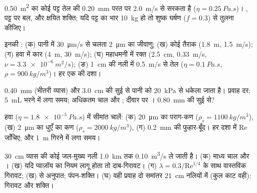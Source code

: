 \begin{exercise}[$\star$]\label{exo:b2:viscous-flows:1}
\qty{0.50}{m^2} का कोई पट्ट तेल की \qty{0.20}{mm} परत पर \qty{2.0}{m/s} से सरकता है
($\eta = \qty{0.25}{Pa.s}$)। , पट्ट पर बल, और क्षयित
शक्ति; यदि पट्ट का भार \qty{10}{kg} हो तो शुष्क घर्षण ($f = 0.3$) से
तुलना कीजिए।
\end{exercise}

\begin{exercise}[$\star$]\label{exo:b2:viscous-flows:2}
इनकी : (क) पानी में \qty{30}{\micro m/s} से चलता
\qty{2}{\micro m} का जीवाणु; (ख) कोई तैराक (\qty{1.8}{m}, \qty{1.5}{m/s}); (ग) हवा में कार (\qty{4}{m},
\qty{30}{m/s}); (घ) महाधमनी में रक्त (\qty{2.5}{cm}, \qty{0.33}{m/s},
$\nu = \qty{3.3e-6}{m^2/s}$); (ङ) \qty{1}{cm} की नली में \qty{0.5}{m/s} से तेल ($\eta = \qty{0.1}{Pa.s}$, $\rho =
\qty{900}{kg/m^3}$)। हर एक की दशा।
\end{exercise}

\begin{exercise}[$\star$]\label{exo:b2:viscous-flows:3}
\qty{0.40}{mm} (भीतरी व्यास) और \qty{3.0}{cm} की सुई से पानी को
\qty{20}{kPa} से धकेला जाता है। प्रवाह दर; \qty{5}{mL} भरने में लगा समय; अधिकतम चाल
और ; दीवार पर । \qty{0.80}{mm} की सुई से?
\end{exercise}

\begin{exercise}[$\star$]\label{exo:b2:viscous-flows:4}
हवा ($\eta = \qty{1.8e-5}{Pa.s}$) में सीमांत चालें: (क) \qty{20}{\micro m}
का पराग-कण ($\rho_s = \qty{1100}{kg/m^3}$), (ख) \qty{2}{\micro m} का धुएँ का
कण ($\rho_s = \qty{2000}{kg/m^3}$), (ग) \qty{0.2}{mm} की फुहार-बूँद।
हर दशा में $\mathrm{Re}$ जाँचिए; और \qty{1}{m} गिरने में लगा समय।
\end{exercise}

\begin{exercise}[$\star\star$]\label{exo:b2:viscous-flows:5}
\qty{30}{cm} व्यास की कोई जल-मुख्य नली \qty{1.0}{km} तक \qty{0.10}{m^3/s}
ले जाती है। (क) माध्य चाल और । (ख) यदि प्वाज़ॉय का नियम
लागू होता तो दाब-गिरावट। (ग) $\lambda = 0.3/\mathrm{Re}^{1/4}$ के साथ वास्तविक गिरावट;
(ख) से अनुपात; पंपन-शक्ति। (घ) वही प्रवाह दो समांतर
\qty{21}{cm} नलियों में (कुल काट वही): गिरावट और शक्ति।
\end{exercise}

